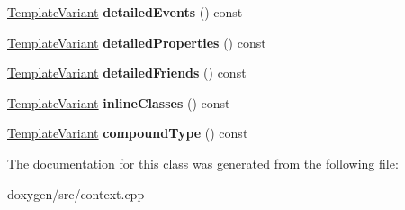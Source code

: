 \begin{DoxyCompactItemize}
\item 
\mbox{\label{class_module_context_1_1_private_af1bc21e8bd3e6bff048db72df805467b}} 
\mbox{\hyperlink{class_template_variant}{Template\+Variant}} {\bfseries detailed\+Events} () const
\item 
\mbox{\label{class_module_context_1_1_private_afb318ffd998c5944eecb25f5aafd6eda}} 
\mbox{\hyperlink{class_template_variant}{Template\+Variant}} {\bfseries detailed\+Properties} () const
\item 
\mbox{\label{class_module_context_1_1_private_a2be830a94ddb0326bd0a53095667c953}} 
\mbox{\hyperlink{class_template_variant}{Template\+Variant}} {\bfseries detailed\+Friends} () const
\item 
\mbox{\label{class_module_context_1_1_private_a5f571307602df6525fd1703db0151358}} 
\mbox{\hyperlink{class_template_variant}{Template\+Variant}} {\bfseries inline\+Classes} () const
\item 
\mbox{\label{class_module_context_1_1_private_a128323d367ec69e8541ceca60cbde594}} 
\mbox{\hyperlink{class_template_variant}{Template\+Variant}} {\bfseries compound\+Type} () const
\end{DoxyCompactItemize}


The documentation for this class was generated from the following file\+:\begin{DoxyCompactItemize}
\item 
doxygen/src/context.\+cpp\end{DoxyCompactItemize}
